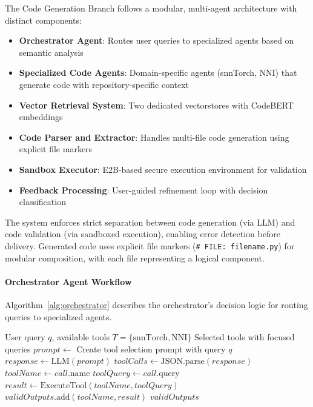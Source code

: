 The Code Generation Branch follows a modular, multi-agent architecture with distinct components:

\begin{itemize}
  \item \textbf{Orchestrator Agent}: Routes user queries to specialized agents based on semantic analysis
  \item \textbf{Specialized Code Agents}: Domain-specific agents (snnTorch, NNI) that generate code with repository-specific context
  \item \textbf{Vector Retrieval System}: Two dedicated vectorstores with CodeBERT embeddings
  \item \textbf{Code Parser and Extractor}: Handles multi-file code generation using explicit file markers
  \item \textbf{Sandbox Executor}: E2B-based secure execution environment for validation
  \item \textbf{Feedback Processing}: User-guided refinement loop with decision classification
\end{itemize}

The system enforces strict separation between code generation (via LLM) and code validation (via sandboxed execution), enabling error detection before delivery. Generated code uses explicit file markers (\texttt{\# FILE: filename.py}) for modular composition, with each file representing a logical component.

\paragraph{Orchestrator Agent Workflow}
Algorithm~\ref{alg:orchestrator} describes the orchestrator's decision logic for routing queries to specialized agents.

\begin{algorithm}
\caption{Orchestrator Agent Tool Selection}
\label{alg:orchestrator}
\begin{algorithmic}[1]
\REQUIRE User query \(q\), available tools \(T = \{\text{snnTorch}, \text{NNI}\}\)
\ENSURE Selected tools with focused queries
\STATE \(prompt \gets \) Create tool selection prompt with query \(q\)
\STATE \(response \gets \text{LLM}(prompt)\)
\STATE \(toolCalls \gets \text{JSON.parse}(response)\)
    \STATE \(toolName \gets call.\text{name}\)
    \STATE \(toolQuery \gets call.\text{query}\)
    \STATE \(result \gets \text{ExecuteTool}(toolName, toolQuery)\)
        \STATE \(validOutputs.\text{add}(toolName, result)\)
    \ENDIF
\ENDFOR
\RETURN \(validOutputs\)
\end{algorithmic}
\end{algorithm}

